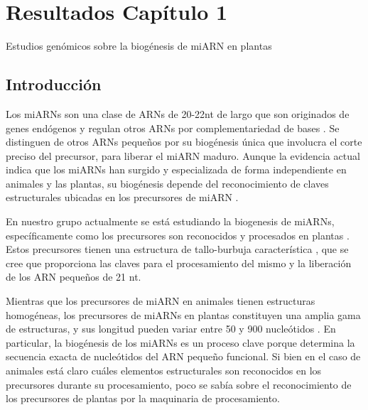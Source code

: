 
\chapter{Resultados Capítulo 1} 
{\LARGE Estudios genómicos sobre la biogénesis de miARN en plantas}

\graphicspath{{Chapter2/Figs/}}

\section{Introducción}
Los miARNs son una clase de ARNs de 20-22nt de largo que son originados de genes endógenos y regulan otros ARNs por complementariedad de bases \citep{Voinnet2009669}.
Se distinguen de otros ARNs pequeños por su biogénesis única que involucra el corte preciso del precursor, para liberar el miARN maduro.
Aunque la evidencia actual indica que los miARNs han surgido y especializada de forma independiente en animales y las plantas, su biogénesis depende del reconocimiento de claves estructurales ubicadas en los precursores de miARN \citep{pmid21554756,citeulike:8816489,Bologna11112012}.

En nuestro grupo actualmente se está estudiando la biogenesis de miARNs, específicamente como los precursores son reconocidos y procesados en plantas \citep{Bologna2013}.
Estos precursores tienen una estructura de tallo-burbuja característica \citep{Jones-Rhoades2006}, que se cree que proporciona las claves para el procesamiento del mismo y la liberación de los ARN pequeños de 21 nt.

Mientras que los precursores de miARN en animales tienen estructuras homogéneas, los precursores de miARNs en plantas constituyen una amplia gama de estructuras, y sus longitud pueden variar entre 50 y 900 nucleótidos \citep{Bologna2013,citeulike:8816489}.
En particular, la biogénesis de los miARNs es un proceso clave porque determina la secuencia exacta de nucleótidos del ARN pequeño funcional.
Si bien en el caso de animales está claro cuáles elementos estructurales son reconocidos en los precursores durante su procesamiento, poco se sabía sobre el reconocimiento de los precursores de plantas por la maquinaria de procesamiento.

